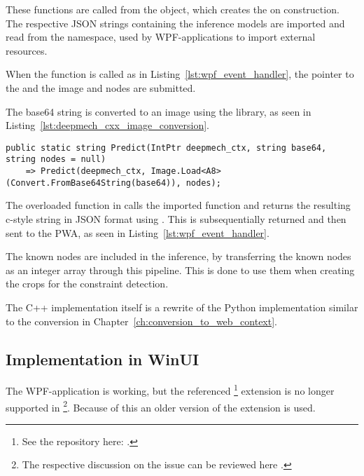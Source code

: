 These functions are called from the  object, which creates the  on construction.
The respective JSON strings containing the inference models are imported and read from the  namespace, used by WPF-applications to import external resources.

When the  function is called as in Listing~\ref{lst:wpf_event_handler}, the pointer to the  and the image and nodes are submitted.

The base64 string is converted to an image using the  library, as seen in Listing~\ref{lst:deepmech_cxx_image_conversion}.%

\begin{lstlisting}[label={lst:deepmech_cxx_image_conversion}, caption={Deepmech\_cxx overload for image conversion.}]
public static string Predict(IntPtr deepmech_ctx, string base64, string nodes = null)
    => Predict(deepmech_ctx, Image.Load<A8>(Convert.FromBase64String(base64)), nodes);
\end{lstlisting}

The overloaded  function in  calls the imported  function and returns the resulting c-style string in JSON format using .
This is subsequentially returned and then sent to the PWA, as seen in Listing~\ref{lst:wpf_event_handler}.

The known nodes are included in the inference, by transferring the known nodes as an integer array through this pipeline.
This is done to use them when creating the crops for the constraint detection.

The C++ implementation itself is a rewrite of the Python implementation similar to the conversion in Chapter~\ref{ch:conversion_to_web_context}.

\subsection{Implementation in WinUI}

The WPF-application is working, but the referenced \footnote{See the repository here: .} extension is no longer supported in \footnote{The respective discussion on the issue can be reviewed here .}.
Because of this an older version of the extension is used.

